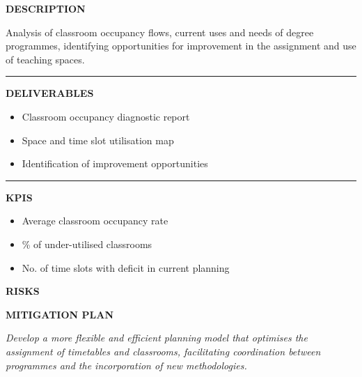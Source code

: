 \documentclass[11pt,a4paper]{scrreprt}
\newcommand{\fieldlabel}[1]{%
  {\footnotesize\sffamily\bfseries\color{mutedcolor}\MakeUppercase{#1}}\par\nopagebreak[4]
}
\newcommand{\fieldsep}{\vspace{3pt}\noindent\textcolor{bordercolor}{\rule{\linewidth}{0.4pt}}\vspace{3pt}\par}
\begin{document}
\begin{tcolorbox}[pabox={espcolor}{A.P.4.1 \enspace\textbullet\enspace Diagnosis and Analysis of Space and Timetable Usage}]

\fieldlabel{Description}
{\small Analysis of classroom occupancy flows, current uses and needs of degree programmes, identifying opportunities for improvement in the assignment and use of teaching spaces.}\par
\fieldsep
\fieldlabel{Deliverables}
{\small \begin{itemize}[noitemsep,topsep=2pt]
\item Classroom occupancy diagnostic report
\item Space and time slot utilisation map
\item Identification of improvement opportunities
\end{itemize}}\par
\fieldsep
\fieldlabel{KPIs}
{\small \begin{itemize}[noitemsep,topsep=2pt]
\item Average classroom occupancy rate
\item \% of under-utilised classrooms
\item No. of time slots with deficit in current planning
\end{itemize}}\par
\end{tcolorbox}
\begin{tcolorbox}[riskbox]
{\footnotesize\sffamily\bfseries\color{red!50!black} RISKS}\par{}
\end{tcolorbox}
\begin{tcolorbox}[mitbox]
{\footnotesize\sffamily\bfseries\color{green!40!black} MITIGATION PLAN}\par{}
\end{tcolorbox}
\vspace{8pt}

\newpage
{}
{\small\color{mutedcolor}\itshape Develop a more flexible and efficient planning model that optimises the assignment of timetables and classrooms, facilitating coordination between programmes and the incorporation of new methodologies.}\par\vspace{6pt}
\end{document}

